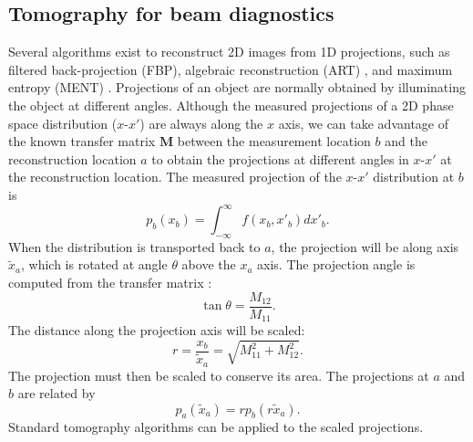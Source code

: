 \subsection{Tomography for beam diagnostics}

Several algorithms exist to reconstruct 2D images from 1D projections, such as filtered back-projection (FBP), algebraic reconstruction (ART) \cite{Slaney1988}, and maximum entropy (MENT) \cite{Minerbo1979}. Projections of an object are normally obtained by illuminating the object at different angles. Although the measured projections of a 2D phase space distribution ($x$-$x'$) are always along the $x$ axis, we can take advantage of the known transfer matrix $\mathbf{M}$ between the measurement location $b$ and the reconstruction location $a$ to obtain the projections at different angles in $x$-$x'$ at the reconstruction location. The measured projection of the $x$-$x'$ distribution at $b$ is
%
\begin{equation}
    p_b(x_b) = \int_{-\infty}^{\infty} f(x_b, x'_b) dx'_b.
\end{equation}
%
When the distribution is transported back to $a$, the projection will be along axis $\tilde{x}_a$, which is rotated at angle $\theta$ above the $x_a$ axis. The projection angle is computed from the transfer matrix \cite{Hock2013a}:
%
\begin{equation}\label{eq:proj_trans_1}
    \tan\theta = \frac{M_{12}}{M_{11}}.
\end{equation}
%
The distance along the projection axis will be scaled:
%
\begin{equation}\label{eq:proj_trans_2}
    r = \frac{x_b}{\tilde{x}_a} = \sqrt{M_{11}^2 + M_{12}^2}.
\end{equation}
%
The projection must then be scaled to conserve its area. The projections at $a$ and $b$ are related by 
%
\begin{equation}\label{eq:proj_trans_3}
    p_a(\tilde{x}_a) = r p_b(r \tilde{x}_a).
\end{equation}
%
Standard tomography algorithms can be applied to the scaled projections.

